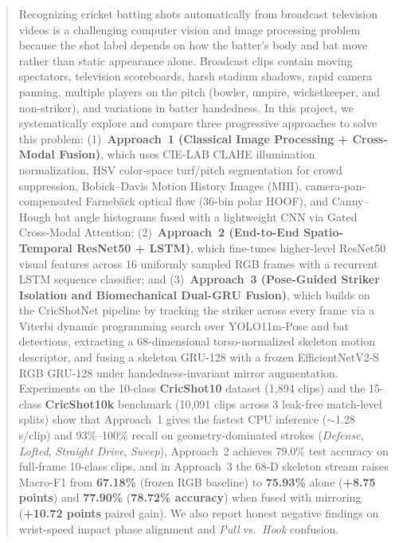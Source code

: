 \begin{abstract}
Recognizing cricket batting shots automatically from broadcast television videos is a challenging computer vision and image processing problem because the shot label depends on how the batter's body and bat move rather than static appearance alone. Broadcast clips contain moving spectators, television scoreboards, harsh stadium shadows, rapid camera panning, multiple players on the pitch (bowler, umpire, wicketkeeper, and non-striker), and variations in batter handedness. In this project, we systematically explore and compare three progressive approaches to solve this problem:
(1)~\textbf{Approach~1 (Classical Image Processing + Cross-Modal Fusion)}, which uses CIE-LAB CLAHE illumination normalization, HSV color-space turf/pitch segmentation for crowd suppression, Bobick--Davis Motion History Images (MHI), camera-pan-compensated Farneb\"{a}ck optical flow (36-bin polar HOOF), and Canny--Hough bat angle histograms fused with a lightweight CNN via Gated Cross-Modal Attention;
(2)~\textbf{Approach~2 (End-to-End Spatio-Temporal ResNet50 + LSTM)}, which fine-tunes higher-level ResNet50 visual features across 16 uniformly sampled RGB frames with a recurrent LSTM sequence classifier; and
(3)~\textbf{Approach~3 (Pose-Guided Striker Isolation and Biomechanical Dual-GRU Fusion)}, which builds on the CricShotNet pipeline by tracking the striker across every frame via a Viterbi dynamic programming search over YOLO11m-Pose and bat detections, extracting a 68-dimensional torso-normalized skeleton motion descriptor, and fusing a skeleton GRU-128 with a frozen EfficientNetV2-S RGB GRU-128 under handedness-invariant mirror augmentation.
Experiments on the 10-class \textbf{CricShot10} dataset (1,894 clips) and the 15-class \textbf{CricShot10k} benchmark (10,091 clips across 3 leak-free match-level splits) show that Approach~1 gives the fastest CPU inference ($\sim$1.28\,s/clip) and 93\%--100\% recall on geometry-dominated strokes (\textit{Defense}, \textit{Lofted}, \textit{Straight Drive}, \textit{Sweep}), Approach~2 achieves 79.0\% test accuracy on full-frame 10-class clips, and in Approach~3 the 68-D skeleton stream raises Macro-F1 from \textbf{67.18\%} (frozen RGB baseline) to \textbf{75.93\%} alone (\textbf{+8.75 points}) and \textbf{77.90\%} (\textbf{78.72\% accuracy}) when fused with mirroring (\textbf{+10.72 points} paired gain). We also report honest negative findings on wrist-speed impact phase alignment and \textit{Pull} vs.\ \textit{Hook} confusion.
\end{abstract}
